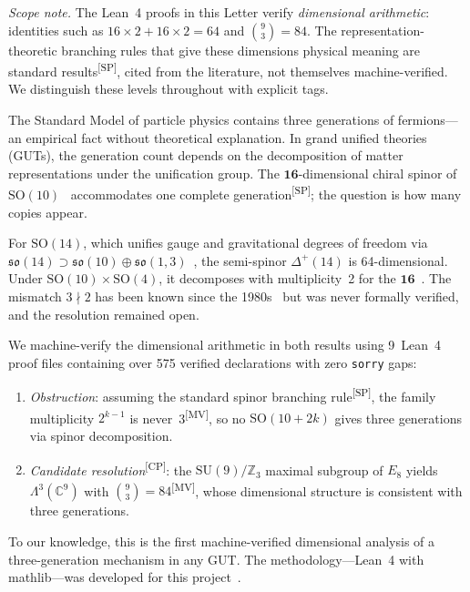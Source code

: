 \documentclass[aps,prl,twocolumn,showpacs,preprintnumbers,superscriptaddress,floatfix]{revtex4-2}
\newcommand{\so}{\mathfrak{so}}
\newcommand{\MV}{\textsuperscript{[MV]}}
\newcommand{\CP}{\textsuperscript{[CP]}}
\newcommand{\SP}{\textsuperscript{[SP]}}
\begin{document}
\emph{Scope note.}  The Lean~4 proofs in this Letter verify
\emph{dimensional arithmetic}: identities such as
$16 \times 2 + 16 \times 2 = 64$ and $\binom{9}{3} = 84$.
The representation-theoretic branching rules that give these
dimensions physical meaning are standard results\SP, cited from
the literature, not themselves machine-verified.  We distinguish
these levels throughout with explicit tags.

The Standard Model of particle physics contains three generations
of fermions---an empirical fact without theoretical explanation.
In grand unified theories (GUTs), the generation count depends on
the decomposition of matter representations under the unification
group.  The $\mathbf{16}$-dimensional chiral spinor of
$\mathrm{SO}(10)$~\cite{fritzsch1975,georgi1975} accommodates one
complete generation\SP; the question is how many copies appear.

For $\mathrm{SO}(14)$, which unifies gauge and gravitational degrees
of freedom via $\so(14) \supset \so(10) \oplus
\so(1,3)$~\cite{nesti2007,nesti2010,krasnov2018}, the semi-spinor
$\Delta^+(14)$ is 64-dimensional.  Under $\mathrm{SO}(10) \times
\mathrm{SO}(4)$, it decomposes with multiplicity~2 for the
$\mathbf{16}$~\cite{wilczek1982,slansky1981}.  The mismatch
$3 \nmid 2$ has been known since the 1980s~\cite{ida1980,ma1981,ramond1998}
but was never formally verified, and the resolution remained open.

We machine-verify the dimensional arithmetic in both results
using 9~Lean~4 proof files containing over 575 verified declarations
with zero \texttt{sorry} gaps:
\begin{enumerate}
  \item \emph{Obstruction}: assuming the standard spinor branching
    rule\SP, the family multiplicity $2^{k-1}$ is never~3\MV,
    so no $\mathrm{SO}(10{+}2k)$ gives three generations via
    spinor decomposition.
  \item \emph{Candidate resolution}\CP: the $\mathrm{SU}(9)/\mathbb{Z}_3$
    maximal subgroup of $E_8$ yields $\Lambda^3(\mathbb{C}^9)$
    with $\binom{9}{3} = 84$\MV, whose dimensional structure
    is consistent with three generations.
\end{enumerate}
To our knowledge, this is the first machine-verified dimensional
analysis of a three-generation mechanism in any GUT.  The
methodology---Lean~4 with mathlib---was developed for this
project~\cite{arnoldy2026cicm,arnoldy2026aaca,arnoldy2026prd}.

\end{document}
